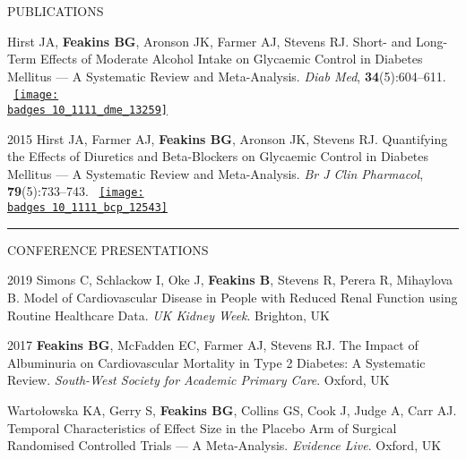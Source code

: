 \documentclass[10pt,a4paper]{article}
\def\badges{./badges/}
\begin{document}
\begin{cvlist}{PUBLICATIONS}
  \item[]
  Hirst JA, \textbf{Feakins BG}, Aronson JK, Farmer AJ, Stevens RJ. Short- and Long-Term Effects of Moderate Alcohol Intake on Glycaemic Control in Diabetes Mellitus --- A Systematic Review and Meta-Analysis. \textit{Diab Med}, \textbf{34}(5):604--611. ~\href{https://wiley.altmetric.com/details/11898077}{\texttt{[image: \\badges 10\_1111\_dme\_13259]}}
  
  \item[2015]
  Hirst JA, Farmer AJ, \textbf{Feakins BG}, Aronson JK, Stevens RJ. Quantifying the Effects of Diuretics and Beta-Blockers on Glycaemic Control in Diabetes Mellitus --- A Systematic Review and Meta-Analysis. \textit{Br J Clin Pharmacol}, \textbf{79}(5):733--743. ~\href{https://wiley.altmetric.com/details/2869563}{\texttt{[image: \\badges 10\_1111\_bcp\_12543]}}
  
\end{cvlist}


\noindent\rule{\textwidth}{0.4pt}
\begin{cvlist}{CONFERENCE PRESENTATIONS}
  
  \item[2019]
  Simons C, Schlackow I, Oke J, \textbf{Feakins B}, Stevens R, Perera R, Mihaylova B. Model of Cardiovascular Disease in People with Reduced Renal Function using Routine Healthcare Data. \textit{UK Kidney Week}. Brighton, UK 
  
  \item[2017]
  \textbf{Feakins BG}, McFadden EC, Farmer AJ, Stevens RJ. The Impact of Albuminuria on Cardiovascular Mortality in Type 2 Diabetes: A Systematic Review. \textit{South-West Society for Academic Primary Care}. Oxford, UK
  
  \item[]
  Warto\l{}owska KA, Gerry S, \textbf{Feakins BG}, Collins GS, Cook J, Judge A, Carr AJ. Temporal Characteristics of Effect Size in the Placebo Arm of Surgical Randomised Controlled Trials --- A Meta-Analysis. \textit{Evidence Live}. Oxford, UK
  
\end{cvlist}
\end{document}
